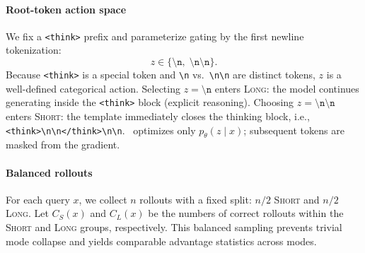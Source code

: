 \paragraph{Root-token action space}
We fix a \texttt{<think>} prefix and parameterize gating by the first newline tokenization:
\vspace{-10pt}
\[
z \in \{\texttt{\textbackslash n},\; \texttt{\textbackslash n\textbackslash n}\}.
\]
Because \texttt{<think>} is a special token and \texttt{\textbackslash n} vs.\ \texttt{\textbackslash n\textbackslash n} are distinct tokens, $z$ is a well-defined categorical action.
Selecting $z=\texttt{\textbackslash n}$ enters \textsc{Long}: the model continues generating inside the \texttt{<think>} block (explicit reasoning).
Choosing $z=\texttt{\textbackslash n\textbackslash n}$ enters \textsc{Short}: the template immediately closes the thinking block, i.e.,
\texttt{<think>\textbackslash n\textbackslash n</think>\textbackslash n\textbackslash n}.
\Ours~optimizes only $p_\theta(z\mid x)$; subsequent tokens are masked from the gradient.

\paragraph{Balanced rollouts}
For each query $x$, we collect $n$ rollouts with a fixed split: $n/2$ \textsc{Short} and $n/2$ \textsc{Long}.
Let $C_S(x)$ and $C_L(x)$ be the numbers of correct rollouts within the \textsc{Short} and \textsc{Long} groups, respectively.
This balanced sampling prevents trivial mode collapse and yields comparable advantage statistics across modes.

\begin{table}[t]
\centering
\small
{}
\caption{
Peak VRAM (GiB) for long-context GRPO with uniform context $S{=}13$K (1K prompt${+}$12K generation) and $B{=}8$ concurrent rollouts. \Ours~gains memory efficiency by updating the root token ($T{=}1$).
LoRA further reduces trainable-state memory with fewer trainable parameters. 
}
\label{tab:vram-root-vs-vanilla}
\end{table}

